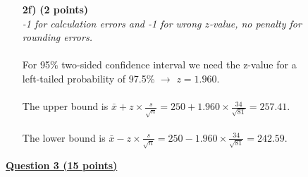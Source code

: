 \begin{itemize}
\item[\textbf{2f)}] \textbf{(2 points)} \\
     \textit{-1 for calculation errors and -1 for wrong $z$-value, no penalty for \\rounding errors.} \\ 
     \\
     For 95\% two-sided confidence interval we need the z-value for a \\left-tailed probability of 97.5\% $\rightarrow$ $z = 1.960$. \\ \\The upper bound is $\bar{x} + z \times \frac{s}{\sqrt{n}} = 250 + 1.960 \times \frac{34}{\sqrt{81}} = 257.41$. \\ \\
     The lower bound is $\bar{x} - z \times \frac{s}{\sqrt{n}} = 250 - 1.960 \times \frac{34}{\sqrt{81}} = 242.59$.
\end{itemize}

\underline{\textbf{Question 3 (15 points)}} \\

